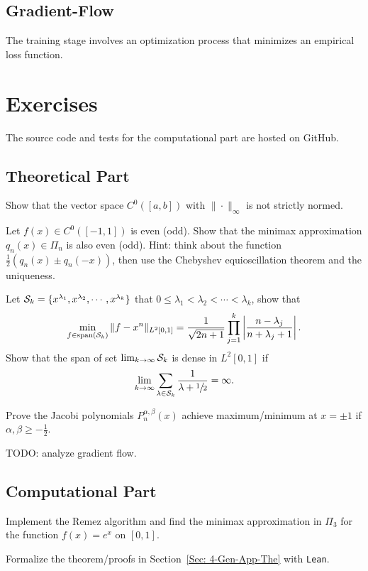 \subsection{Gradient-Flow}
The training stage involves an optimization process that minimizes an empirical loss function.
\section{Exercises}
The source code and tests for the computational part are hosted on GitHub.
\subsection{Theoretical Part}
\begin{problem}
    Show that the vector space $C^0([a, b])$ with $\|\cdot\|_{\infty}$ is not strictly normed.
\end{problem}
\begin{problem}
    Let $f(x)\in C^0([-1,1])$ is even (odd). Show that the minimax approximation $q_n(x)\in\Pi_n$ is also even (odd).
    Hint: think about the function $\frac{1}{2}(q_n(x) \pm q_n(-x))$, then use the Chebyshev equioscillation theorem and the uniqueness.
\end{problem}
\begin{problem}
    Let $\mathcal S_k = \{x^{\lambda_1}, x^{\lambda_2}, \cdots, x^{\lambda_k}\}$ that $0\le \lambda_1 < \lambda_2 < \cdots < \lambda_k$, show that 
    \begin{equation}\nonumber
        \min_{f\in \textrm{span}(\mathcal S_k)} \|f - x^{n}\|_{L^2[0, 1]} = \frac{1}{\sqrt{2n+1}}\prod_{j=1}^k\left|\frac{n - \lambda_j}{n + \lambda_j + 1}\right|.
    \end{equation}
    Show that the span of set $\lim_{k\to\infty}\mathcal S_k$ is dense in $L^2[0, 1]$ if 
    \begin{equation}
      \lim_{k\to\infty}  \sum_{\lambda\in \mathcal S_k} \frac{1}{\lambda+\sfrac{1}{2}} = \infty. 
    \end{equation}
\end{problem}
\begin{problem}
    Prove the Jacobi polynomials $P_n^{\alpha, \beta}(x)$ achieve maximum/minimum at $x= \pm 1$ if $\alpha, \beta \ge -\frac{1}{2}$.  
\end{problem}

\begin{problem}
    TODO: analyze gradient flow.
\end{problem}
\subsection{Computational Part}
\begin{problem}
    Implement the Remez algorithm and find the minimax approximation in $\Pi_3$ for the function $f(x) = e^x$ on $[0, 1]$.
\end{problem}

\begin{problem}
    Formalize the theorem/proofs in Section~\ref{Sec: 4-Gen-App-The} with \texttt{Lean}.
\end{problem}

\nocite{trefethen2019approximation,cheney2009course, muskhelishvili2008singular, elliott1974asymptotic}


